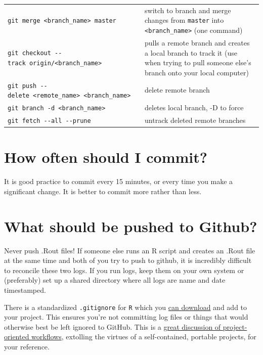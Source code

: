 \documentclass[
]{book}
\begin{document}
\begin{longtable}[]{@{}
  >{\raggedright\arraybackslash}p{}
  >{\raggedright\arraybackslash}p{}@{}}
\texttt{git\ merge\ \textless{}branch\_name\textgreater{}\ master} & switch to branch and merge changes from \texttt{master} into \texttt{\textless{}branch\_name\textgreater{}} (one command) \\
\texttt{git\ checkout\ -\/-track\ origin/\textless{}branch\_name\textgreater{}} & pulls a remote branch and creates a local branch to track it (use when trying to pull someone else's branch onto your local computer) \\
\texttt{git\ push\ -\/-delete\ \textless{}remote\_name\textgreater{}\ \textless{}branch\_name\textgreater{}} & delete remote branch \\
\texttt{git\ branch\ -d\ \textless{}branch\_name\textgreater{}} & deletes local branch, -D to force \\
\texttt{git\ fetch\ -\/-all\ -\/-prune} & untrack deleted remote branches \\
\bottomrule
\end{longtable}

\hypertarget{how-often-should-i-commit}{%
\section{How often should I commit?}\label{how-often-should-i-commit}}

It is good practice to commit every 15 minutes, or every time you make a significant change. It is better to commit more rather than less.

\hypertarget{what-should-be-pushed-to-github}{%
\section{What should be pushed to Github?}\label{what-should-be-pushed-to-github}}

Never push .Rout files! If someone else runs an R script and creates an .Rout file at the same time and both of you try to push to github, it is incredibly difficult to reconcile these two logs. If you run logs, keep them on your own system or (preferably) set up a shared directory where all logs are name and date timestamped.

There is a standardized \texttt{.gitignore} for \texttt{R} which you \href{https://github.com/github/gitignore/blob/master/R.gitignore}{can download} and add to your project. This ensures you're not committing log files or things that would otherwise best be left ignored to GitHub. This is a \href{https://www.tidyverse.org/articles/2017/12/workflow-vs-script/}{great discussion of project-oriented workflows}, extolling the virtues of a self-contained, portable projects, for your reference.
\end{document}
